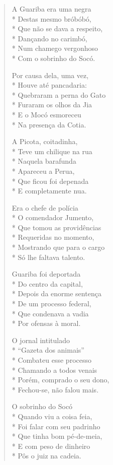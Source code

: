 \begin{verse}
A Guariba era uma negra\\*
Destas mesmo bróbóbó,\\*
Que não se dava a respeito,\\*
Dançando no carimbó,\\*
Num chamego vergonhoso\\*
Com o sobrinho do Socó.

Por causa dela, uma vez,\\*
Houve até pancadaria:\\*
Quebraram a perna do Gato\\*
Furaram os olhos da Jia\\*
E o Mocó esmoreceu\\*
Na presença da Cotia.

A Picota, coitadinha,\\*
Teve um chilique na rua\\*
Naquela barafunda\\*
Apareceu a Perua,\\*
Que ficou foi depenada\\*
E completamente nua.

Era o chefe de polícia\\*
O comendador Jumento,\\*
Que tomou as providências\\*
Requeridas no momento,\\*
Mostrando que para o cargo\\*
Só lhe faltava talento.

Guariba foi deportada\\*
Do centro da capital,\\*
Depois da enorme sentença\\*
De um processo federal,\\*
Que condenava a vadia\\*
Por ofensas à moral.

O jornal intitulado\\*
“Gazeta dos animais”\\*
Combateu esse processo\\*
Chamando a todos venais\\*
Porém, comprado o seu dono,\\*
Fechou-se, não falou mais.

O sobrinho do Socó \\*
Quando viu a coisa feia,\\*
Foi falar com seu padrinho\\*
Que tinha bom pé-de-meia,\\*
E com peso de dinheiro\\*
Pôs o juiz na cadeia.


\end{verse}
